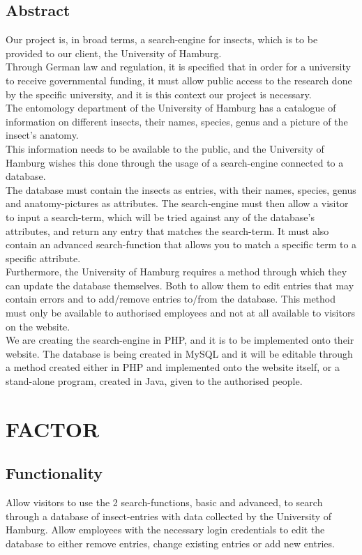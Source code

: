 \documentclass[12pt,a4paper]{article}
\begin{document}
\subsection{Abstract}
Our project is, in broad terms, a search-engine for insects, which is to be provided to our client, the University of Hamburg.\\
Through German law and regulation, it is specified that in order for a university to receive governmental funding, it must allow public access to the research done by the specific university, and it is this context our project is necessary.\\
The entomology department of the University of Hamburg has a catalogue of information on different insects, their names, species, genus and a picture of the insect’s anatomy.\\
This information needs to be available to the public, and the University of Hamburg wishes this done through the usage of a search-engine connected to a database.\\
The database must contain the insects as entries, with their names, species, genus and anatomy-pictures as attributes. The search-engine must then allow a visitor to input a search-term, which will be tried against any of the database’s attributes, and return any entry that matches the search-term.
It must also contain an advanced search-function that allows you to match a specific term to a specific attribute.\\
Furthermore, the University of Hamburg requires a method through which they can update the database themselves. Both to allow them to edit entries that may contain errors and to add/remove entries to/from the database. This method must only be available to authorised employees and not at all available to visitors on the website. \\
We are creating the search-engine in PHP, and it is to be implemented onto their website. The database is being created in MySQL and it will be editable through a method created either in PHP and implemented onto the website itself, or a stand-alone program, created in Java, given to the authorised people.\\

\newpage

\section{FACTOR}
\subsection{Functionality}
Allow visitors to use the 2 search-functions, basic and advanced, to search through a database of insect-entries with data collected by the University of Hamburg.
Allow employees with the necessary login credentials to edit the database to either remove entries, change existing entries or add new entries.
\end{document}
